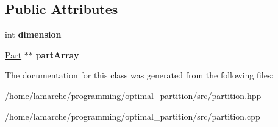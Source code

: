 \subsection*{Public Attributes}
\begin{DoxyCompactItemize}
\item 
\hypertarget{classMultiPart_a9ec48eb39e06eff6209d36db3f39219e}{int {\bfseries dimension}}\label{classMultiPart_a9ec48eb39e06eff6209d36db3f39219e}

\item 
\hypertarget{classMultiPart_a4d526314b79359136dc2c596c0615543}{\hyperlink{classPart}{Part} $\ast$$\ast$ {\bfseries part\-Array}}\label{classMultiPart_a4d526314b79359136dc2c596c0615543}

\end{DoxyCompactItemize}


The documentation for this class was generated from the following files\-:\begin{DoxyCompactItemize}
\item 
/home/lamarche/programming/optimal\-\_\-partition/src/partition.\-hpp\item 
/home/lamarche/programming/optimal\-\_\-partition/src/partition.\-cpp\end{DoxyCompactItemize}
